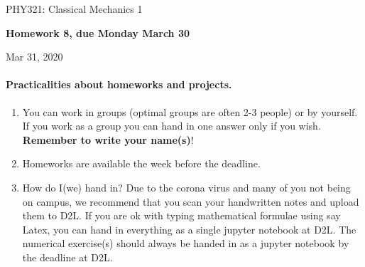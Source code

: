 \documentclass[%
oneside,                 %
final,                   %
10pt]{article}
\begin{document}

\newcommand{\exercisesection}[1]{\subsection*{#1}}






\thispagestyle{empty}

\begin{center}
{\LARGE\bf
\begin{spacing}{1.25}
PHY321: Classical Mechanics 1
\end{spacing}
}
\end{center}


\begin{center}
{\bf Homework 8, due Monday  March 30${}^{}$} \\ [0mm]
\end{center}

\begin{center}
\end{center}
    

\begin{center}
Mar 31, 2020
\end{center}

\vspace{1cm}


\paragraph{Practicalities about  homeworks and projects.}
\begin{enumerate}
\item You can work in groups (optimal groups are often 2-3 people) or by yourself. If you work as a group you can hand in one answer only if you wish. \textbf{Remember to write your name(s)}!

\item Homeworks are available  the week before the deadline. 

\item How do I(we)  hand in?  Due to the corona virus and many of you not being on campus, we recommend that you scan your handwritten notes and upload them to D2L. If you are ok with typing mathematical formulae using say Latex, you can hand in everything as a single jupyter notebook at D2L. The numerical exercise(s) should always be handed in as a jupyter notebook by the deadline at D2L. 
\end{enumerate}
\end{document}
